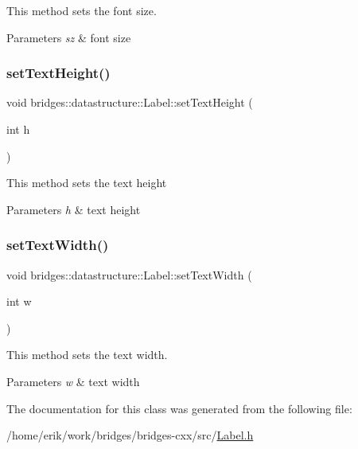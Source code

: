 This method sets the font size. 


\begin{DoxyParams}{Parameters}
{\em sz} & font size \\
\hline
\end{DoxyParams}
\mbox{\label{classbridges_1_1datastructure_1_1_label_acd095180b94bad422f7c26182680a958}} 
\subsubsection{\texorpdfstring{set\+Text\+Height()}{setTextHeight()}}
{\footnotesize\ttfamily void bridges\+::datastructure\+::\+Label\+::set\+Text\+Height (\begin{DoxyParamCaption}\item[{int}]{h }\end{DoxyParamCaption})\hspace{0.3cm}{\ttfamily [inline]}}

This method sets the text height


\begin{DoxyParams}{Parameters}
{\em h} & text height \\
\hline
\end{DoxyParams}
\mbox{\label{classbridges_1_1datastructure_1_1_label_a323af06f4536c644d6cc265b332b6ad0}} 
\subsubsection{\texorpdfstring{set\+Text\+Width()}{setTextWidth()}}
{\footnotesize\ttfamily void bridges\+::datastructure\+::\+Label\+::set\+Text\+Width (\begin{DoxyParamCaption}\item[{int}]{w }\end{DoxyParamCaption})\hspace{0.3cm}{\ttfamily [inline]}}



This method sets the text width. 


\begin{DoxyParams}{Parameters}
{\em w} & text width \\
\hline
\end{DoxyParams}


The documentation for this class was generated from the following file\+:\begin{DoxyCompactItemize}
\item 
/home/erik/work/bridges/bridges-\/cxx/src/\hyperlink{_label_8h}{Label.\+h}\end{DoxyCompactItemize}
